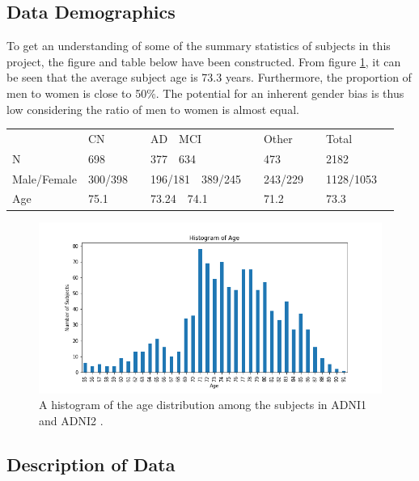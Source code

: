 \documentclass[11pt, fleqn, titlepage]{article}
\newcommand{\1}[1]{\mathds{1}\left[#1\right]}
\begin{document}
\subsection{Data Demographics}
To get an understanding of some of the summary statistics of subjects in this project, the figure and table below have been constructed. From figure \ref{fig:age}, it can be seen that the average subject age is 73.3 years. Furthermore, the proportion of men to women is close to 50\%. The potential for an inherent gender bias is thus low considering the ratio of men to women is almost equal.

\begin{table}[H]
	\begin{tabular}{llllll}
		& CN&\ \ AD\ \ MCI &\ \ Other &\ \ Total   \\
		N & 698&\ \ 377\ \ 634 &\ \ 473 &\ \ 2182   \\
		Male/Female & 300/398&\ \ 196/181\ \ 389/245 &\ \ 243/229  &\ \ 1128/1053   \\
		Age & 75.1&\ \ 73.24\ \ 74.1 &\ \ 71.2 &\ \ 73.3   \\
	\end{tabular}
\end{table}


\begin{figure}[H]
	\centering
	\includegraphics[width=0.9\linewidth]{imgs/age_distro}
	\caption{A histogram of the age distribution among the subjects in ADNI1 and ADNI2 \cite{adni,adni1}.}
	\label{fig:age}
\end{figure}


\subsection{Description of Data} \label{dataDescription}

\end{document}
